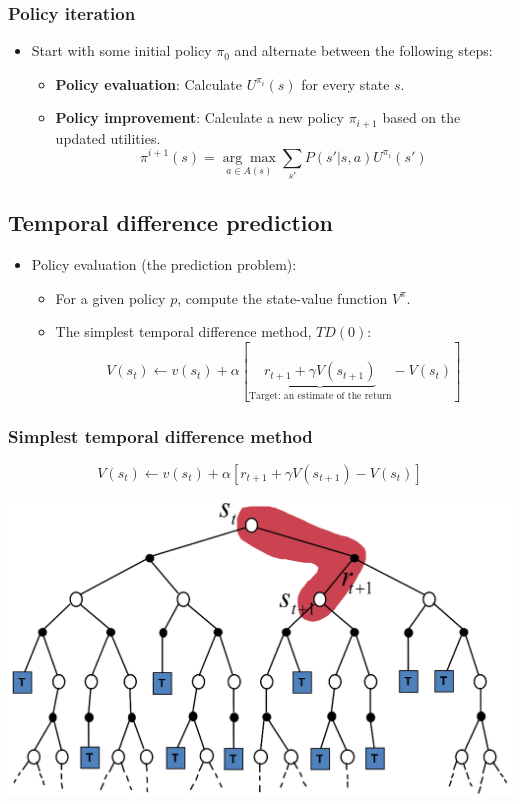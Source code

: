 \documentclass[11pt]{article}
\begin{document}
\subsubsection{Policy iteration}
\label{sec:orgb2ebd11}
\begin{itemize}
\item Start with some initial policy \(\pi_0\) and alternate between the following steps:
\begin{itemize}
\item \textbf{Policy evaluation}: Calculate \(U^{\pi_i} (s)\) for every state \(s\).
\item \textbf{Policy improvement}: Calculate a new policy \(\pi_{i + 1}\) based on the updated utilities.
\[\pi^{i + 1} (s) = \underset{a \in A(s)} {\arg \max} \sum_{s'} P (s' | s, a) U^{\pi_i} (s')\]
\end{itemize}
\end{itemize}
\subsection{Temporal difference prediction}
\label{sec:org7d00b13}
\begin{itemize}
\item Policy evaluation (the prediction problem):
\begin{itemize}
\item For a given policy \(p\), compute the state-value function \(V^{\pi}\).
\item The simplest temporal difference method, \(TD(0)\):
\[V(s_t) \leftarrow v(s_t) + \alpha [\underbrace{r_{t + 1} + \gamma V(s_{t + 1})}_{\text{Target: an estimate of the return}} - V(s_t)]\]
\end{itemize}
\end{itemize}
\subsubsection{Simplest temporal difference method}
\label{sec:orgeac0377}
\[V(s_t) \leftarrow v(s_t) + \alpha [r_{t + 1} + \gamma V(s_{t + 1}) - V(s_t)]\]

\begin{center}
\includegraphics[width=.9\linewidth]{./images/simplest-temporaral-difference-method-tree.png}
\end{center}
\end{document}
